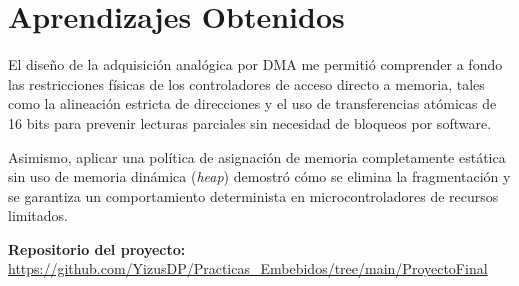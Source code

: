 \documentclass[conference]{IEEEtran}
\begin{document}
\section*{Aprendizajes Obtenidos}

El diseño de la adquisición analógica por DMA me permitió comprender a fondo las restricciones físicas de los controladores de acceso directo a memoria, tales como la alineación estricta de direcciones y el uso de transferencias atómicas de 16 bits para prevenir lecturas parciales sin necesidad de bloqueos por software.

Asimismo, aplicar una política de asignación de memoria completamente estática sin uso de memoria dinámica (\textit{heap}) demostró cómo se elimina la fragmentación y se garantiza un comportamiento determinista en microcontroladores de recursos limitados.

\vspace{0.3cm}
\noindent\textbf{Repositorio del proyecto:} \\
\url{https://github.com/YizusDP/Practicas_Embebidos/tree/main/ProyectoFinal}
\end{document}
